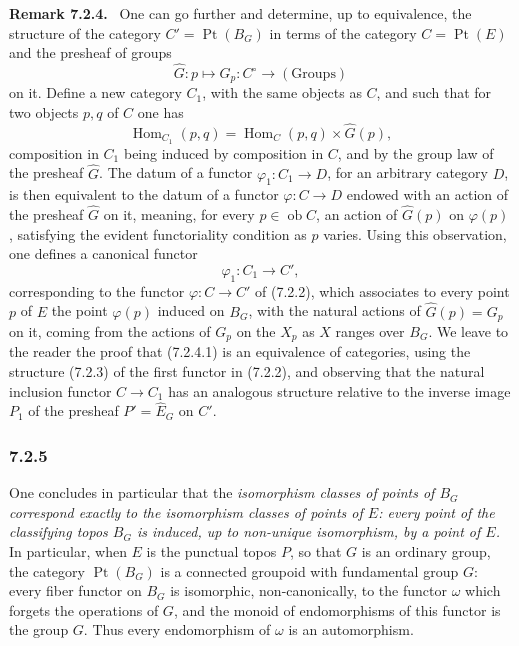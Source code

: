 \documentclass[11pt]{article}
\newcommand{\Hom}{\operatorname{Hom}}
\newcommand{\Ppoint}{\operatorname{Pt}}
\newenvironment{remarktext}[1]{\par\medskip\noindent\textbf{#1.}\ }{\par\medskip}
\providecommand{\ob}{\operatorname{ob}}
\begin{document}
\begin{remarktext}{Remark 7.2.4}
One can go further and determine, up to equivalence, the structure of the category \(C'=\Ppoint(B_G)\) in terms of the category \(C=\Ppoint(E)\) and the presheaf of groups
\[
\widehat G:p\longmapsto G_p:C^\circ\longrightarrow (\text{Groups})
\]
on it. Define a new category \(C_1\), with the same objects as \(C\), and such that for two objects \(p,q\) of \(C\) one has
\[
\Hom_{C_1}(p,q)=\Hom_C(p,q)\times\widehat G(p),
\]
composition in \(C_1\) being induced by composition in \(C\), and by the group law of the presheaf \(\widehat G\). The datum of a functor \(\varphi_1:C_1\to D\), for an arbitrary category \(D\), is then equivalent to the datum of a functor \(\varphi:C\to D\) endowed with an action of the presheaf \(\widehat G\) on it, meaning, for every \(p\in\ob C\), an action of \(\widehat G(p)\) on \(\varphi(p)\), satisfying the evident functoriality condition as \(p\) varies. Using this observation, one defines a canonical functor
\begin{equation*}
\varphi_1:C_1\longrightarrow C',\tag{7.2.4.1}
\end{equation*}
corresponding to the functor \(\varphi:C\to C'\) of (7.2.2), which associates to every point \(p\) of \(E\) the point \(\varphi(p)\) induced on \(B_G\), with the natural actions of \(\widehat G(p)=G_p\) on it, coming from the actions of \(G_p\) on the \(X_p\) as \(X\) ranges over \(B_G\). We leave to the reader the proof that (7.2.4.1) is an equivalence of categories, using the structure (7.2.3) of the first functor in (7.2.2), and observing that the natural inclusion functor \(C\to C_1\) has an analogous structure relative to the inverse image \(P_1\) of the presheaf \(P'=\widehat E_G\) on \(C'\).
\end{remarktext}

\subsubsection*{7.2.5}
One concludes in particular that the \emph{isomorphism classes of points of \(B_G\) correspond exactly to the isomorphism classes of points of \(E\): every point of the classifying topos \(B_G\) is induced, up to non-unique isomorphism, by a point of \(E\).} In particular, when \(E\) is the punctual topos \(P\), so that \(G\) is an ordinary group, the category \(\Ppoint(B_G)\) is a connected groupoid with fundamental group \(G\): every fiber functor on \(B_G\) is isomorphic, non-canonically, to the functor \(\omega\) which forgets the operations of \(G\), and the monoid of endomorphisms of this functor is the group \(G\). Thus every endomorphism of \(\omega\) is an automorphism.
\end{document}
